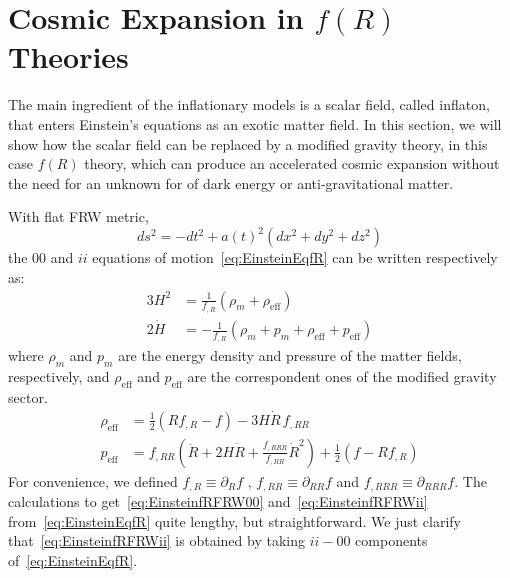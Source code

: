 \section{Cosmic Expansion in \texorpdfstring{$f(R)$}{f(R)} Theories}\label{sec:expansion}
The main ingredient of the inflationary models is a scalar field, called inflaton, that enters Einstein’s equations as an exotic matter field. In this section, we will show how the scalar field can be replaced by a modified gravity theory, in this case $f(R)$ theory, which can produce an accelerated cosmic expansion without the need for an unknown for of dark energy or anti-gravitational matter. 

With flat FRW metric, 
\begin{equation}
ds^{2} = -dt^{2} + a(t)^{2}\left(dx^{2} + dy^{2} + dz^{2}\right)
\end{equation}
the $00$ and $ii$  equations of motion~\eqref{eq:EinsteinEqfR} can be written respectively as:
\begin{align}
3H^{2} &= \frac{1}{f_{,R}}\left(\rho_{m} + \rho_{\mathrm{eff}}\right) \label{eq:EinsteinfRFRW00}\\[4pt] 
2\dot{H} &= -\frac{1}{f_{,R}}\left(\rho_{m} + p_{m} + \rho_{\mathrm{eff}} + p_{\mathrm{eff}}\right) \label{eq:EinsteinfRFRWii}
\end{align}
where $\rho_{m}$ and $p_{m}$ are the energy density and pressure of the matter fields, respectively, and $\rho_{\mathrm{eff}}$ and $p_{\mathrm{eff}}$ are the correspondent ones of the modified gravity sector.
\begin{align}
\rho_{\mathrm{eff}} &= \tfrac12\!\left(R f_{,R} - f\right) - 3H\dot{R}\,f_{,RR} \\[6pt]
p_{\mathrm{eff}} &= f_{,RR}\!\left(\ddot{R} + 2H\dot{R} + \frac{f_{,RRR}}{f_{,RR}}\dot{R}^{2}\right)
                  + \tfrac12\!\left(f - R f_{,R}\right)
\end{align}
For convenience, we defined $f_{,R}\equiv \partial_R f$ , $f_{,RR}\equiv \partial_{RR} f$ and $f_{,RRR}\equiv \partial_{RRR} f$.
The calculations to get~\eqref{eq:EinsteinfRFRW00} and~\eqref{eq:EinsteinfRFRWii} from~\eqref{eq:EinsteinEqfR} quite lengthy, but straightforward. We just clarify that~\eqref{eq:EinsteinfRFRWii} is obtained by taking $ii - 00$ components of~\eqref{eq:EinsteinEqfR}.

